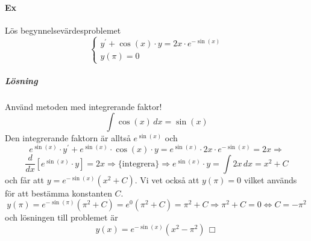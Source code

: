 \paragraph{Ex} Lös begynnelsevärdesproblemet
\begin{equation*}
    \left\lbrace
    \begin{matrix}
        y^\prime+\cos(x)\cdot y=2x\cdot e^{-\sin(x)} \\
        y(\pi)=0
    \end{matrix}
    \right.
\end{equation*}
\subparagraph{Lösning}
Använd metoden med integrerande faktor!
\begin{equation*}
    \int\cos(x)\, dx=\sin(x)
\end{equation*}
Den integrerande faktorn är alltså $e^{\sin(x)}$ och
\begin{equation*}
    e^{\sin(x)}\cdot y^\prime+e^{\sin(x)}\cdot \cos(x)\cdot y=
    e^{\sin(x)}\cdot 2x\cdot e^{-\sin(x)}=
    2x\Rightarrow
\end{equation*}
\begin{equation*}
    \frac{d}{dx}[e^{\sin(x)}\cdot y]=
    2x\Rightarrow
    \{\text{integrera}\}\Rightarrow
    e^{\sin(x)}\cdot y=
    \int 2x\, dx=
    x^2+C
\end{equation*}
och får att $y=e^{-\sin(x)}(x^2+C)$.
Vi vet också att $y(\pi)=0$ vilket används för att bestämma konstanten $C$.
\begin{equation*}
    y(\pi)=
    e^{-\sin(\pi)}(\pi^2+C)=
    e^0(\pi^2+C)=
    \pi^2+C\Rightarrow
    \pi^2+C=0\Leftrightarrow
    C=-\pi^2
\end{equation*}
och lösningen till problemet är
\begin{equation*}
    y(x)=e^{-\sin(x)}(x^2-\pi^2)\, \Box
\end{equation*}


